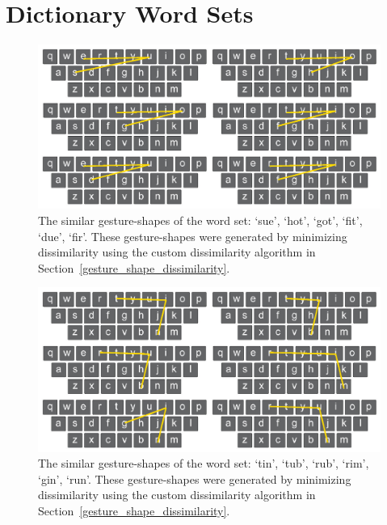 \chapter{Dictionary Word Sets} \label{dictionary_sets}

\begin{figure}[h]
	\centering
	\includegraphics[width=5in]{Figures/fig_words_1}
	\caption[Word Set 1]{The similar gesture-shapes of the word set: `sue', `hot', `got', `fit', `due', `fir'. These gesture-shapes were generated by minimizing dissimilarity using the custom dissimilarity algorithm in Section~\ref{gesture_shape_dissimilarity}.}
	\label{fig_words_1}
\end{figure}

\clearpage

\begin{figure}[t]
	\centering
	\includegraphics[width=5in]{Figures/fig_words_2}
	\caption[Word Set 2]{The similar gesture-shapes of the word set: `tin', `tub', `rub', `rim', `gin', `run'. These gesture-shapes were generated by minimizing dissimilarity using the custom dissimilarity algorithm in Section~\ref{gesture_shape_dissimilarity}.}
	\label{fig_words_2}
\end{figure}

